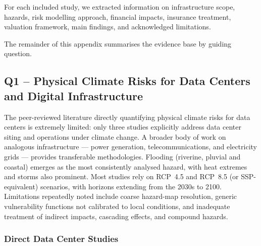 For each included study, we extracted information on infrastructure scope,
hazards, risk modelling approach, financial impacts, insurance treatment,
valuation framework, main findings, and acknowledged limitations.

\vspace{0.3cm}
\noindent The remainder of this appendix summarises the evidence base by
guiding question.


\subsection{Q1 – Physical Climate Risks for Data Centers and Digital Infrastructure}
\label{app:literature_q1}

The peer-reviewed literature directly quantifying physical climate risks for
data centers is extremely limited: only three studies explicitly address data
center siting and operations under climate change. A broader body of work on
analogous infrastructure — power generation, telecommunications, and
electricity grids — provides transferable methodologies. Flooding (riverine,
pluvial and coastal) emerges as the most consistently analysed hazard, with
heat extremes and storms also prominent. Most studies rely on RCP~4.5 and
RCP~8.5 (or SSP-equivalent) scenarios, with horizons extending from the 2030s
to 2100. Limitations repeatedly noted include coarse hazard-map resolution,
generic vulnerability functions not calibrated to local conditions, and
inadequate treatment of indirect impacts, cascading effects, and compound
hazards.

\subsubsection{Direct Data Center Studies}

